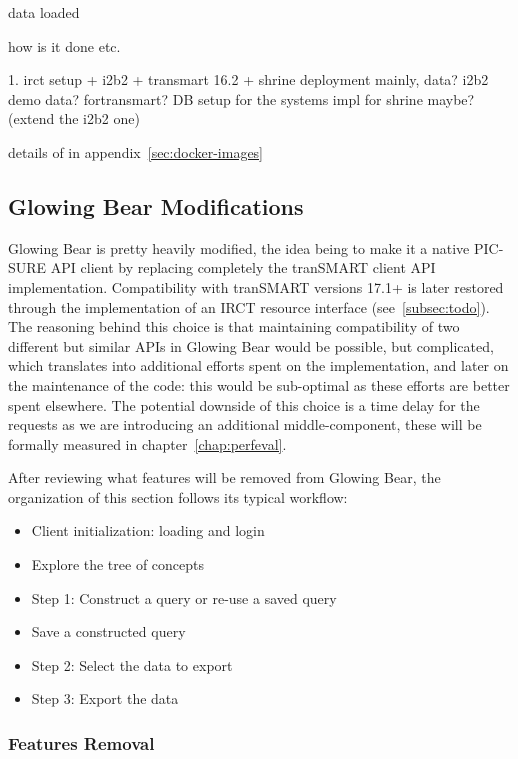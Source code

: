 data loaded

how is it done etc.

1. irct setup + i2b2 + transmart 16.2 + shrine
deployment mainly, data? i2b2 demo data? fortransmart? 
DB setup for the systems
impl for shrine maybe? (extend the i2b2 one)

details of in appendix~\ref{sec:docker-images}


\subsection{Glowing Bear Modifications}

Glowing Bear is pretty heavily modified, the idea being to make it a native PIC-SURE API client by replacing completely the tranSMART client API implementation. 
Compatibility with tranSMART versions 17.1+ is later restored through the implementation of an IRCT resource interface (see~\ref{subsec:todo}).
The reasoning behind this choice is that maintaining compatibility of two different but similar APIs in Glowing Bear would be possible, but complicated, which translates into additional efforts spent on the implementation, and later on the maintenance of the code: this would be sub-optimal as these efforts are better spent elsewhere.
The potential downside of this choice is a time delay for the requests as we are introducing an additional middle-component, these will be formally measured in chapter~\ref{chap:perfeval}.

After reviewing what features will be removed from Glowing Bear, the organization of this section follows its typical workflow:
\begin{itemize}
    \item Client initialization: loading and login
    \item Explore the tree of concepts
    \item Step 1: Construct a query or re-use a saved query
    \item Save a constructed query
    \item Step 2: Select the data to export
    \item Step 3: Export the data
\end{itemize}

\subsubsection{Features Removal}

